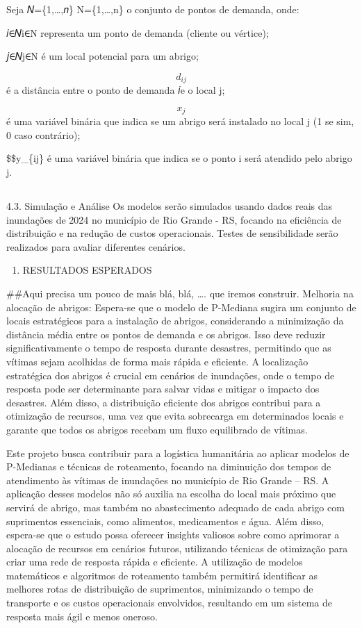 \documentclass[
]{article}
\providecommand{\tightlist}{%
  \setlength{\itemsep}{0pt}\setlength{\parskip}{0pt}}
\begin{document}
Seja 𝑁=\{1,\ldots,𝑛\} N=\{1,\ldots,n\} o conjunto de pontos de demanda,
onde:

𝑖∈𝑁i∈N representa um ponto de demanda (cliente ou vértice);

𝑗∈𝑁j∈N é um local potencial para um abrigo;

\[d_{ij}\] é a distância entre o ponto de demanda 𝑖e o local j;

\[x_{j}\] é uma variável binária que indica se um abrigo será instalado
no local j (1 se sim, 0 caso contrário);

\$\$y\_\{ij\} é uma variável binária que indica se o ponto i será
atendido pelo abrigo j.

\subsection{}\label{section}

4.3. Simulação e Análise Os modelos serão simulados usando dados reais
das inundações de 2024 no município de Rio Grande - RS, focando na
eficiência de distribuição e na redução de custos operacionais. Testes
de sensibilidade serão realizados para avaliar diferentes cenários.

\begin{enumerate}
\def\labelenumi{\arabic{enumi}.}
\setcounter{enumi}{4}
\tightlist
\item
  RESULTADOS ESPERADOS
\end{enumerate}

\#\#Aqui precisa um pouco de mais blá, blá, \ldots. que iremos
construir. Melhoria na alocação de abrigos: Espera-se que o modelo de
P-Mediana sugira um conjunto de locais estratégicos para a instalação de
abrigos, considerando a minimização da distância média entre os pontos
de demanda e os abrigos. Isso deve reduzir significativamente o tempo de
resposta durante desastres, permitindo que as vítimas sejam acolhidas de
forma mais rápida e eficiente. A localização estratégica dos abrigos é
crucial em cenários de inundações, onde o tempo de resposta pode ser
determinante para salvar vidas e mitigar o impacto dos desastres. Além
disso, a distribuição eficiente dos abrigos contribui para a otimização
de recursos, uma vez que evita sobrecarga em determinados locais e
garante que todos os abrigos recebam um fluxo equilibrado de vítimas.

Este projeto busca contribuir para a logística humanitária ao aplicar
modelos de P-Medianas e técnicas de roteamento, focando na diminuição
dos tempos de atendimento às vítimas de inundações no município de Rio
Grande -- RS. A aplicação desses modelos não só auxilia na escolha do
local mais próximo que servirá de abrigo, mas também no abastecimento
adequado de cada abrigo com suprimentos essenciais, como alimentos,
medicamentos e água. Além disso, espera-se que o estudo possa oferecer
insights valiosos sobre como aprimorar a alocação de recursos em
cenários futuros, utilizando técnicas de otimização para criar uma rede
de resposta rápida e eficiente. A utilização de modelos matemáticos e
algoritmos de roteamento também permitirá identificar as melhores rotas
de distribuição de suprimentos, minimizando o tempo de transporte e os
custos operacionais envolvidos, resultando em um sistema de resposta
mais ágil e menos oneroso.
\end{document}
